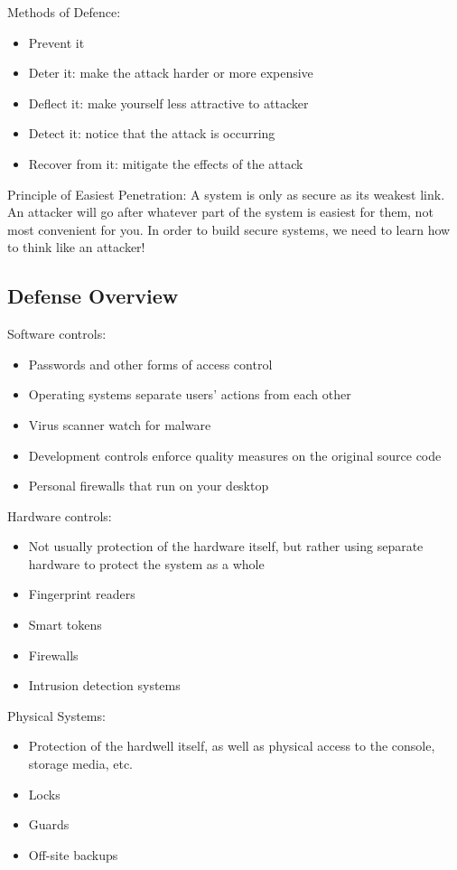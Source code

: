Methods of Defence:

\begin{itemize}
    \item Prevent it
    \item Deter it: make the attack harder or more expensive
    \item Deflect it: make yourself less attractive to attacker
    \item Detect it: notice that the attack is occurring
    \item Recover from it: mitigate the effects of the attack
\end{itemize}

Principle of Easiest Penetration: A system is only as secure as its weakest link. An attacker will go after whatever part of the system is easiest for them, not most convenient for you. In order to build secure systems, we need to learn how to think like an attacker!

\subsection{Defense Overview}
Software controls:
\begin{itemize}
    \item Passwords and other forms of access control
    \item Operating systems separate users' actions from each other
    \item Virus scanner watch for malware
    \item Development controls enforce quality measures on the original source code 
    \item Personal firewalls that run on your desktop
\end{itemize}

Hardware controls:
\begin{itemize}
    \item Not usually protection of the hardware itself, but rather using separate hardware to protect the system as a whole 
    \item Fingerprint readers
    \item Smart tokens
    \item Firewalls
    \item Intrusion detection systems
\end{itemize}

Physical Systems:
\begin{itemize}
    \item Protection of the hardwell itself, as well as physical access to the console, storage media, etc.
    \item Locks
    \item Guards
    \item Off-site backups
\end{itemize}

